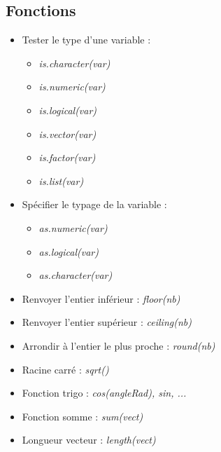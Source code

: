 \documentclass[12pt,a4paper]{article}
\begin{document}
\subsection{Fonctions}
\begin{itemize}
\item Tester le type d'une variable :
\begin{itemize}
\item \textit{is.character(var)}
\item \textit{is.numeric(var)}
\item \textit{is.logical(var)}
\item \textit{is.vector(var)}
\item \textit{is.factor(var)}
\item \textit{is.list(var)}
\end{itemize}
\item Spécifier le typage de la variable :
\begin{itemize}
\item \textit{as.numeric(var)}
\item \textit{as.logical(var)}
\item \textit{as.character(var)}
\end{itemize}
\item Renvoyer l'entier inférieur : \textit{floor(nb)}
\item Renvoyer l'entier supérieur : \textit{ceiling(nb)}
\item Arrondir à l'entier le plus proche : \textit{round(nb)}
\item Racine carré : \textit{sqrt()}
\item Fonction trigo : \textit{cos(angleRad), sin, ...}
\item Fonction somme : \textit{sum(vect)}
\item Longueur vecteur : \textit{length(vect)}
\end{itemize}
\end{document}
